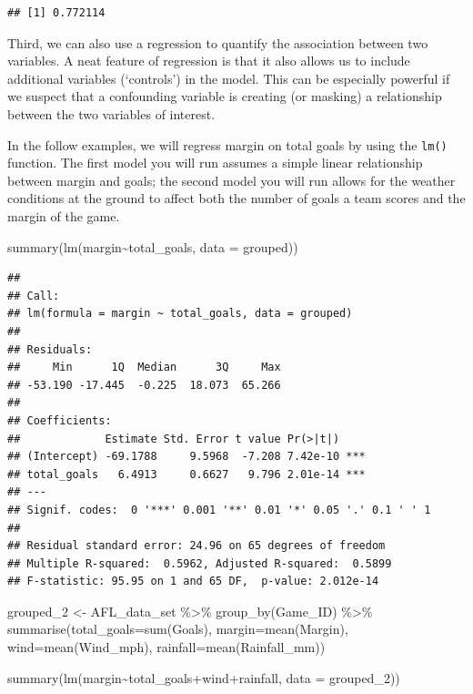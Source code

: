 \documentclass[
]{article}
\newenvironment{Shaded}{\begin{snugshade}}{\end{snugshade}}
\newcommand{\AttributeTok}[1]{\textcolor[rgb]{0.77,0.63,0.00}{#1}}
\newcommand{\FunctionTok}[1]{\textcolor[rgb]{0.00,0.00,0.00}{#1}}
\newcommand{\NormalTok}[1]{#1}
\newcommand{\OtherTok}[1]{\textcolor[rgb]{0.56,0.35,0.01}{#1}}
\newcommand{\SpecialCharTok}[1]{\textcolor[rgb]{0.00,0.00,0.00}{#1}}
\begin{document}
\begin{verbatim}
## [1] 0.772114
\end{verbatim}

Third, we can also use a regression to quantify the association between
two variables. A neat feature of regression is that it also allows us to
include additional variables (`controls') in the model. This can be
especially powerful if we suspect that a confounding variable is
creating (or masking) a relationship between the two variables of
interest.

In the follow examples, we will regress margin on total goals by using
the \texttt{lm()} function. The first model you will run assumes a
simple linear relationship between margin and goals; the second model
you will run allows for the weather conditions at the ground to affect
both the number of goals a team scores and the margin of the game.

\begin{Shaded}
\begin{Highlighting}[]
\FunctionTok{summary}\NormalTok{(}\FunctionTok{lm}\NormalTok{(margin}\SpecialCharTok{\textasciitilde{}}\NormalTok{total\_goals, }\AttributeTok{data =}\NormalTok{ grouped))}
\end{Highlighting}
\end{Shaded}

\begin{verbatim}
## 
## Call:
## lm(formula = margin ~ total_goals, data = grouped)
## 
## Residuals:
##     Min      1Q  Median      3Q     Max 
## -53.190 -17.445  -0.225  18.073  65.266 
## 
## Coefficients:
##             Estimate Std. Error t value Pr(>|t|)    
## (Intercept) -69.1788     9.5968  -7.208 7.42e-10 ***
## total_goals   6.4913     0.6627   9.796 2.01e-14 ***
## ---
## Signif. codes:  0 '***' 0.001 '**' 0.01 '*' 0.05 '.' 0.1 ' ' 1
## 
## Residual standard error: 24.96 on 65 degrees of freedom
## Multiple R-squared:  0.5962, Adjusted R-squared:  0.5899 
## F-statistic: 95.95 on 1 and 65 DF,  p-value: 2.012e-14
\end{verbatim}

\begin{Shaded}
\begin{Highlighting}[]
\NormalTok{grouped\_2 }\OtherTok{\textless{}{-}}\NormalTok{ AFL\_data\_set }\SpecialCharTok{\%\textgreater{}\%}
  \FunctionTok{group\_by}\NormalTok{(Game\_ID) }\SpecialCharTok{\%\textgreater{}\%}
  \FunctionTok{summarise}\NormalTok{(}\AttributeTok{total\_goals=}\FunctionTok{sum}\NormalTok{(Goals), }\AttributeTok{margin=}\FunctionTok{mean}\NormalTok{(Margin), }\AttributeTok{wind=}\FunctionTok{mean}\NormalTok{(Wind\_mph), }\AttributeTok{rainfall=}\FunctionTok{mean}\NormalTok{(Rainfall\_mm))}

\FunctionTok{summary}\NormalTok{(}\FunctionTok{lm}\NormalTok{(margin}\SpecialCharTok{\textasciitilde{}}\NormalTok{total\_goals}\SpecialCharTok{+}\NormalTok{wind}\SpecialCharTok{+}\NormalTok{rainfall, }\AttributeTok{data =}\NormalTok{ grouped\_2))}
\end{Highlighting}
\end{Shaded}
\end{document}
